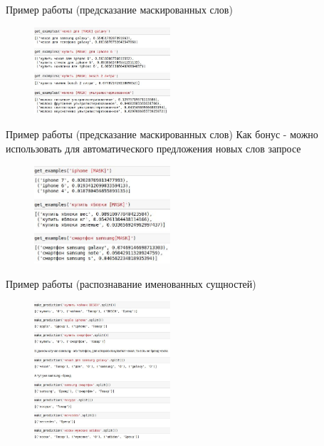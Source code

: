 \begin{frame}{Пример работы (предсказание маскированных слов)}
	\begin{figure}[H]
		\includegraphics[width=0.45\textwidth]{mlm.jpg}
		\label{fig:sample}
	\end{figure}
	

\end{frame}
\begin{frame}{Пример работы (предсказание маскированных слов)}
	Как бонус - можно использовать для автоматического предложения новых слов запросе
	\begin{figure}[H]
		\includegraphics[width=0.45\textwidth]{mlm2.jpg}
		\label{fig:sample}
	\end{figure}
\end{frame}
\begin{frame}{Пример работы (распознавание именованных сущностей)}
	\begin{figure}[H]
		\includegraphics[width=0.45\textwidth]{ner.jpg}
		\label{fig:sample}
	\end{figure}
\end{frame}

